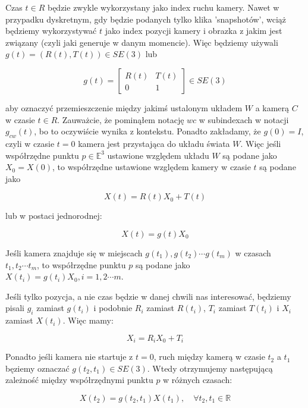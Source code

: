 \documentclass[a4paper,12pt]{article}
\newcommand{\E}{\mathbb{E}}
\newcommand{\R}{\mathbb{R}}
\begin{document}
Czas $t \in R$ będzie zwykle wykorzystany jako index ruchu kamery. Nawet w przypadku dyskretnym, gdy będzie podanych tylko klika 'snapshotów', wciąż będziemy wykorzystywać $t$ jako index pozycji kamery i obrazka z jakim jest związany (czyli jaki generuje w danym momencie). Więc będziemy używali $g(t)=(R(t),T(t)) \in SE(3)$ lub

\begin{equation}
g(t)=\begin{bmatrix} R(t) & T(t) \\ 0 & 1 \end{bmatrix} \in SE(3)
\end{equation}

\noindent aby oznaczyć przemieszczenie między jakimś ustalonym układem $W$ a kamerą $C$ w czasie $t \in R$. Zauważcie, że pominąłem notację $wc$ w subindexach w notacji $g_{cw}(t)$, bo to oczywiście wynika z kontekstu. Ponadto zakładamy, że $g(0)=I$, czyli w czasie $t=0$ kamera jest przystająca do układu świata $W$. Więc jeśli współrzędne punktu $p \in \E^3$ ustawione względem układu $W$ są podane jako $X_0 = X(0)$, to współrzędne ustawione względem kamery w czasie $t$ są podane jako

\begin{equation}
X(t)=R(t)X_0 + T(t)
\end{equation}

\noindent lub w postaci jednorodnej:

\begin{equation}
X(t)=g(t)X_0
\end{equation}

Jeśli kamera znajduje się w miejscach $g(t_1), g(t_2) \cdots g(t_m)$ w czasach $t_1,t_2 \cdots t_m$, to współrzędne punktu $p$ są podane jako $X(t_i)=g(t_i)X_0,i=1,2 \cdots m$.

Jeśli tylko pozycja, a nie czas będzie w danej chwili nas interesować, będziemy pisali $g_i$ zamiast $g(t_i)$ i podobnie $R_i$ zamiast $R(t_i)$, $T_i$ zamiast $T(t_i)$ i $X_i$ zamiast $X(t_i)$. Więc mamy:

\begin{equation}
X_i = R_iX_0 + T_i
\end{equation}

Ponadto jeśli kamera nie startuje z $t=0$, ruch między kamerą w czasie $t_2$ a $t_1$ bęziemy oznaczać $g(t_2,t_1) \in SE(3)$. Wtedy otrzymujemy następującą zależność między współrzędnymi punktu $p$ w różnych czasach:

\begin{equation}
X(t_2)=g(t_2,t_1)X(t_1), \quad \forall t_2,t_1 \in \R
\end{equation}
\end{document}
